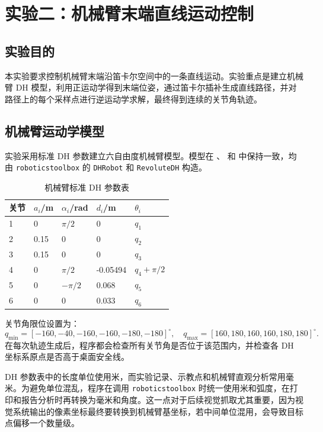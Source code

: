 \section{实验二：机械臂末端直线运动控制}

\subsection{实验目的}

本实验要求控制机械臂末端沿笛卡尔空间中的一条直线运动。实验重点是建立机械臂 DH 模型，利用正运动学得到末端位姿，通过笛卡尔插补生成直线路径，并对路径上的每个采样点进行逆运动学求解，最终得到连续的关节角轨迹。

\subsection{机械臂运动学模型}

实验采用标准 DH 参数建立六自由度机械臂模型。模型在 、 和  中保持一致，均由 \texttt{roboticstoolbox} 的 \texttt{DHRobot} 和 \texttt{RevoluteDH} 构造。

\begin{table}[H]
  \centering
  \caption{机械臂标准 DH 参数表}
  \label{tab:dh-params}
  \small
  \begin{tabularx}{\textwidth}{L{1.5cm}YYYY}
    \toprule
    关节 & $a_i$/m & $\alpha_i$/rad & $d_i$/m & $\theta_i$ \\
     & 0 & $\pi/2$ & 0 & $q_1$ \\
    2 & 0.15 & 0 & 0 & $q_2$ \\
    3 & 0.15 & 0 & 0 & $q_3$ \\
    4 & 0 & $\pi/2$ & -0.05494 & $q_4+\pi/2$ \\
    5 & 0 & $-\pi/2$ & 0.068 & $q_5$ \\
    6 & 0 & 0 & 0.033 & $q_6$ \\
    \bottomrule
  \end{tabularx}
\end{table}

关节角限位设置为：
\[
q_{\min}=[-160,-40,-160,-160,-180,-180]^\circ,
\quad
q_{\max}=[160,180,160,160,180,180]^\circ .
\]
在每次轨迹生成后，程序都会检查所有关节角是否位于该范围内，并检查各 DH 坐标系原点是否高于桌面安全线。

DH 参数表中的长度单位使用米，而实验记录、示教点和机械臂直观分析常用毫米。为避免单位混乱，程序在调用 \texttt{roboticstoolbox} 时统一使用米和弧度，在打印和报告分析时再转换为毫米和角度。这一点对于后续视觉抓取尤其重要，因为视觉系统输出的像素坐标最终要转换到机械臂基坐标，若中间单位混用，会导致目标点偏移一个数量级。

